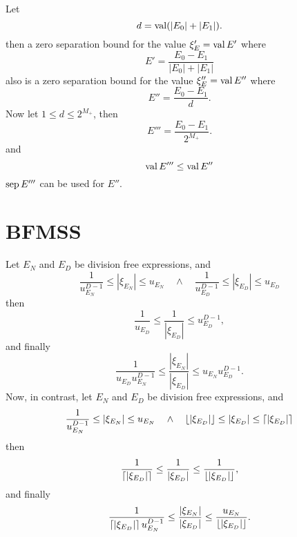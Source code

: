 Let 
\begin{equation}
  d = \mathop{\rm val}\nolimits(|E_0| + |E_1|).
\end{equation}
then a zero separation bound 
for the value $\xi_E'=\mathop{\rm val}\nolimits E'$ where
\begin{equation}
  E' = \frac{E_0 - E_1}{|E_0| + |E_1|}
\end{equation}
also is a zero separation bound 
for the value $\xi_E''=\mathop{\rm val}\nolimits E''$ where
\begin{equation}
  E'' = \frac{E_0 - E_1}{d}.
\end{equation}
Now let $1 \le d \le 2^{M_+}$,
then 
\begin{equation}
  E''' = \frac{E_0 - E_1}{2^{M_+}}.
\end{equation}
and
\begin{equation}
  \mathop{\rm val}\nolimits E''' \le \mathop{\rm val}\nolimits E''
\end{equation}
$\mathop{\rm sep}\nolimits E'''$ can be used for $E''$.



\section{BFMSS}

Let $E_N$ and $E_D$ be division free expressions,
and
\begin{equation}
  \frac{1}{u_{E_N}^{D-1}} \le |\xi_{E_N}| \le u_{E_N}
  \quad\land\quad
  \frac{1}{u_{E_D}^{D-1}} \le |\xi_{E_D}| \le u_{E_D}
\end{equation}
then
\begin{equation}
  \frac{1}{u_{E_D}} \le \frac{1}{|\xi_{E_D}|} \le u_{E_D}^{D-1},
\end{equation}
and finally
\begin{equation}
  \frac{1}{u_{E_D}u_{E_N}^{D-1}} \le \frac{|\xi_{E_N}|}{|\xi_{E_D}|} \le u_{E_N}u_{E_D}^{D-1}.
\end{equation}
Now, in contrast, let $E_N$ and $E_D$ be division free expressions,
and
\begin{equation}
  \frac{1}{u_{E_N}^{D-1}} \le |\xi_{E_N}| \le u_{E_N}
  \quad\land\quad
  \left\lfloor |\xi_{E_D}| \right\rfloor \le |\xi_{E_D}| \le \left\lceil |\xi_{E_D}| \right\rceil
\end{equation}
then
\begin{equation}
  \frac{1}{\left\lceil |\xi_{E_D}| \right\rceil} \le \frac{1}{|\xi_{E_D}|} \le \frac{1}{\left\lfloor |\xi_{E_D}| \right\rfloor},
\end{equation}
and finally
\begin{equation}
  \frac{1}{\left\lceil |\xi_{E_D}| \right\rceil u_{E_N}^{D-1}} \le \frac{|\xi_{E_N}|}{|\xi_{E_D}|} \le \frac{u_{E_N}}{\left\lfloor |\xi_{E_D}| \right\rfloor}.
\end{equation}


